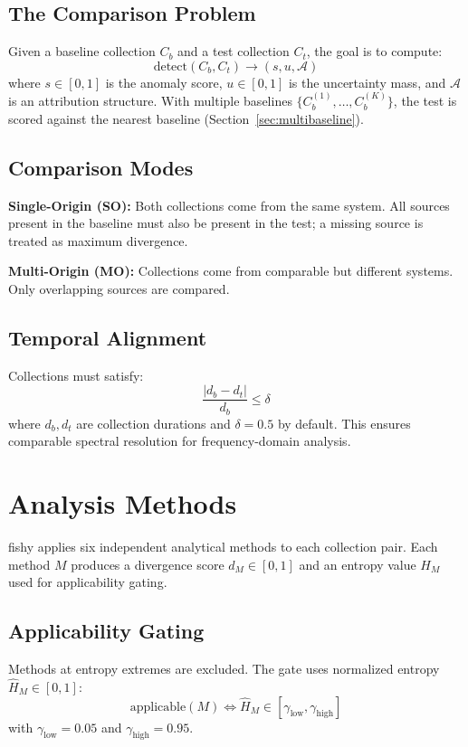 \documentclass[10pt,twocolumn]{article}
\begin{document}
\subsection{The Comparison Problem}

Given a baseline collection $C_b$ and a test collection $C_t$, the goal is to compute:
\[
\text{detect}(C_b, C_t) \to (s, u, \mathcal{A})
\]
where $s \in [0,1]$ is the anomaly score, $u \in [0,1]$ is the uncertainty mass, and $\mathcal{A}$ is an attribution structure. With multiple baselines $\{C_b^{(1)}, \ldots, C_b^{(K)}\}$, the test is scored against the nearest baseline (Section~\ref{sec:multibaseline}).

\subsection{Comparison Modes}

\textbf{Single-Origin (SO):} Both collections come from the same system. All sources present in the baseline must also be present in the test; a missing source is treated as maximum divergence.

\textbf{Multi-Origin (MO):} Collections come from comparable but different systems. Only overlapping sources are compared.

\subsection{Temporal Alignment}

Collections must satisfy:
\[
\frac{|d_b - d_t|}{d_b} \leq \delta
\]
where $d_b, d_t$ are collection durations and $\delta = 0.5$ by default. This ensures comparable spectral resolution for frequency-domain analysis.

\section{Analysis Methods}

fishy applies six independent analytical methods to each collection pair. Each method $M$ produces a divergence score $d_M \in [0,1]$ and an entropy value $H_M$ used for applicability gating.

\subsection{Applicability Gating}

Methods at entropy extremes are excluded. The gate uses normalized entropy $\hat{H}_M \in [0,1]$:
\[
\text{applicable}(M) \iff \hat{H}_M \in [\gamma_{\text{low}}, \gamma_{\text{high}}]
\]
with $\gamma_{\text{low}} = 0.05$ and $\gamma_{\text{high}} = 0.95$.
\end{document}
